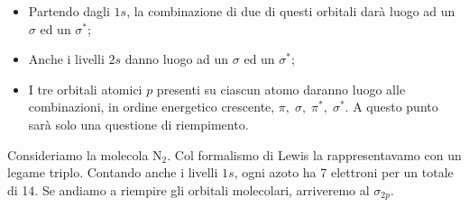 \begin{itemize}
    \item Partendo dagli $1s$, la combinazione di due di questi orbitali darà luogo ad un $\sigma$ ed un $\sigma^*$;
    \item Anche i livelli $2s$ danno luogo ad un $\sigma$ ed un $\sigma^*$;
    \item I tre orbitali atomici $p$ presenti su ciascun atomo daranno luogo alle combinazioni, in ordine energetico crescente, $\pi,\; \sigma, \; \pi^*, \; \sigma^*$. A questo punto sarà solo una questione di riempimento.
\end{itemize}

Consideriamo la molecola N$_2$. Col formalismo di Lewis la rappresentavamo con un legame triplo. Contando anche i livelli $1s$, ogni azoto ha 7 elettroni per un totale di 14. Se andiamo a riempire gli orbitali molecolari, arriveremo al $\sigma_{2p}$. 
